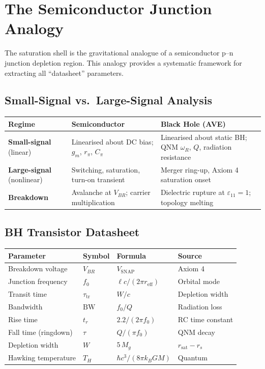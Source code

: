 \section{The Semiconductor Junction Analogy}
\label{sec:junction_analogy}

The saturation shell is the gravitational analogue of a semiconductor p--n junction depletion region. This analogy provides a systematic framework for extracting all ``datasheet'' parameters.

\subsection{Small-Signal vs.\ Large-Signal Analysis}

\begin{center}
\renewcommand{\arraystretch}{1.3}
\begin{tabular}{l p{5cm} p{5cm}}
\toprule
\textbf{Regime} & \textbf{Semiconductor} & \textbf{Black Hole (AVE)} \\
\midrule
\textbf{Small-signal} (linear) &
  Linearised about DC bias; $g_m$, $r_\pi$, $C_\pi$ &
  Linearised about static BH; QNM $\omega_R$, $Q$, radiation resistance \\
\textbf{Large-signal} (nonlinear) &
  Switching, saturation, turn-on transient &
  Merger ring-up, Axiom 4 saturation onset \\
\textbf{Breakdown} &
  Avalanche at $V_{BR}$; carrier multiplication &
  Dielectric rupture at $\varepsilon_{11} = 1$; topology melting \\
\bottomrule
\end{tabular}
\end{center}

\subsection{BH Transistor Datasheet}

\begin{center}
\renewcommand{\arraystretch}{1.3}
\begin{tabular}{l l l l}
\toprule
\textbf{Parameter} & \textbf{Symbol} & \textbf{Formula} & \textbf{Source} \\
\midrule
Breakdown voltage & $V_{BR}$ & $V_\mathrm{SNAP}$ & Axiom 4 \\
Junction frequency & $f_0$ & $\ell c / (2\pi r_\mathrm{eff})$ & Orbital mode \\
Transit time & $\tau_\mathrm{tr}$ & $W/c$ & Depletion width \\
Bandwidth & $\mathrm{BW}$ & $f_0 / Q$ & Radiation loss \\
Rise time & $t_r$ & $2.2 / (2\pi f_0)$ & RC time constant \\
Fall time (ringdown) & $\tau$ & $Q / (\pi f_0)$ & QNM decay \\
Depletion width & $W$ & $5\,M_g$ & $r_\mathrm{sat} - r_s$ \\
Hawking temperature & $T_H$ & $\hbar c^3/(8\pi k_B G M)$ & Quantum \\
\bottomrule
\end{tabular}
\end{center}


